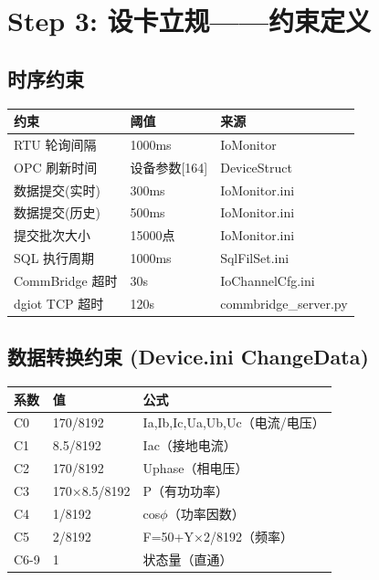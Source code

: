 \documentclass[12pt,a4paper]{ctexart}
\begin{document}
\section{Step 3: 设卡立规——约束定义}

\subsection{时序约束}
\begin{table}[H]\centering
\begin{tabular}{lll}
\toprule
\textbf{约束} & \textbf{阈值} & \textbf{来源} \\
\midrule
RTU 轮询间隔 & 1000ms & IoMonitor \\
OPC 刷新时间 & 设备参数[164] & DeviceStruct \\
数据提交(实时) & 300ms & IoMonitor.ini \\
数据提交(历史) & 500ms & IoMonitor.ini \\
提交批次大小 & 15000点 & IoMonitor.ini \\
SQL 执行周期 & 1000ms & SqlFilSet.ini \\
CommBridge 超时 & 30s & IoChannelCfg.ini \\
dgiot TCP 超时 & 120s & commbridge\_server.py \\
\bottomrule
\end{tabular}
\end{table}

\subsection{数据转换约束 (Device.ini ChangeData)}
\begin{table}[H]\centering
\begin{tabular}{lll}
\toprule
\textbf{系数} & \textbf{值} & \textbf{公式} \\
\midrule
C0 & 170/8192 & Ia,Ib,Ic,Ua,Ub,Uc（电流/电压） \\
C1 & 8.5/8192 & Iac（接地电流） \\
C2 & 170/8192 & Uphase（相电压） \\
C3 & 170×8.5/8192 & P（有功功率） \\
C4 & 1/8192 & cos$\phi$（功率因数） \\
C5 & 2/8192 & F=50+Y×2/8192（频率） \\
C6-9 & 1 & 状态量（直通） \\
\bottomrule
\end{tabular}
\end{table}
\end{document}
